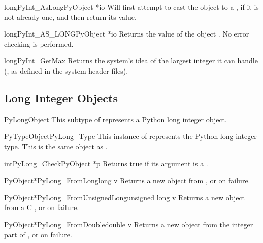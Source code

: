 \documentclass{manual}
\begin{document}
\begin{cfuncdesc}{long}{PyInt_AsLong}{PyObject *io}
Will first attempt to cast the object to a , if
it is not already one, and then return its value.
\end{cfuncdesc}

\begin{cfuncdesc}{long}{PyInt_AS_LONG}{PyObject *io}
Returns the value of the object .  No error checking is
performed.
\end{cfuncdesc}

\begin{cfuncdesc}{long}{PyInt_GetMax}{}
Returns the system's idea of the largest integer it can handle
(, as defined in the system
header files).
\end{cfuncdesc}


\subsection{Long Integer Objects \label{longObjects}}

\begin{ctypedesc}{PyLongObject}
This subtype of  represents a Python long integer
object.
\end{ctypedesc}

\begin{cvardesc}{PyTypeObject}{PyLong_Type}
This instance of  represents the Python long
integer type.  This is the same object as .
\end{cvardesc}

\begin{cfuncdesc}{int}{PyLong_Check}{PyObject *p}
Returns true if its argument is a .
\end{cfuncdesc}

\begin{cfuncdesc}{PyObject*}{PyLong_FromLong}{long v}
Returns a new  object from , or \NULL{} on
failure.
\end{cfuncdesc}

\begin{cfuncdesc}{PyObject*}{PyLong_FromUnsignedLong}{unsigned long v}
Returns a new  object from a C , or \NULL{} on failure.
\end{cfuncdesc}

\begin{cfuncdesc}{PyObject*}{PyLong_FromDouble}{double v}
Returns a new  object from the integer part of
, or \NULL{} on failure.
\end{cfuncdesc}
\end{document}
